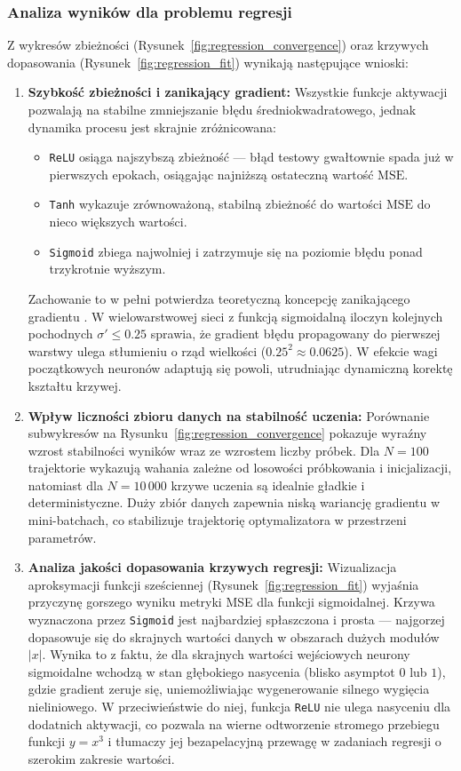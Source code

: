 \documentclass[11pt,a4paper]{article}
\begin{document}
\subsubsection{Analiza wyników dla problemu regresji}
Z wykresów zbieżności (Rysunek~\ref{fig:regression_convergence}) oraz krzywych dopasowania (Rysunek~\ref{fig:regression_fit}) wynikają następujące wnioski:
\begin{enumerate}
    \item \textbf{Szybkość zbieżności i zanikający gradient:}
    Wszystkie funkcje aktywacji pozwalają na stabilne zmniejszanie błędu średniokwadratowego, jednak dynamika procesu jest skrajnie zróżnicowana:
    \begin{itemize}
        \item \texttt{ReLU} osiąga najszybszą zbieżność — błąd testowy gwałtownie spada już w pierwszych epokach, osiągając najniższą ostateczną wartość $\text{MSE}$.
        \item \texttt{Tanh} wykazuje zrównoważoną, stabilną zbieżność do wartości $\text{MSE}$ do nieco większych wartości.
        \item \texttt{Sigmoid} zbiega najwolniej i zatrzymuje się na poziomie błędu ponad trzykrotnie wyższym.
    \end{itemize}
    Zachowanie to w pełni potwierdza teoretyczną koncepcję zanikającego gradientu . W wielowarstwowej sieci z funkcją sigmoidalną iloczyn kolejnych pochodnych $\sigma' \le 0.25$ sprawia, że gradient błędu propagowany do pierwszej warstwy ulega stłumieniu o rząd wielkości ($0.25^2 \approx 0.0625$). W efekcie wagi początkowych neuronów adaptują się powoli, utrudniając dynamiczną korektę kształtu krzywej.

    \item \textbf{Wpływ liczności zbioru danych na stabilność uczenia:}
    Porównanie subwykresów na Rysunku~\ref{fig:regression_convergence} pokazuje wyraźny wzrost stabilności wyników wraz ze wzrostem liczby próbek. Dla $N = 100$ trajektorie wykazują wahania zależne od losowości próbkowania i inicjalizacji, natomiast dla $N = 10\,000$ krzywe uczenia są idealnie gładkie i deterministyczne. Duży zbiór danych zapewnia niską wariancję gradientu w mini-batchach, co stabilizuje trajektorię optymalizatora w przestrzeni parametrów.

    \item \textbf{Analiza jakości dopasowania krzywych regresji:}
    Wizualizacja aproksymacji funkcji sześciennej (Rysunek~\ref{fig:regression_fit}) wyjaśnia przyczynę gorszego wyniku metryki MSE dla funkcji sigmoidalnej. Krzywa wyznaczona przez \texttt{Sigmoid} jest najbardziej spłaszczona i prosta — najgorzej dopasowuje się do skrajnych wartości danych w obszarach dużych modułów $|x|$. Wynika to z faktu, że dla skrajnych wartości wejściowych neurony sigmoidalne wchodzą w stan głębokiego nasycenia (blisko asymptot $0$ lub $1$), gdzie gradient zeruje się, uniemożliwiając wygenerowanie silnego wygięcia nieliniowego. 
    W przeciwieństwie do niej, funkcja \texttt{ReLU} nie ulega nasyceniu dla dodatnich aktywacji, co pozwala na wierne odtworzenie stromego przebiegu funkcji $y = x^3$ i tłumaczy jej bezapelacyjną przewagę w zadaniach regresji o szerokim zakresie wartości.
\end{enumerate}
\end{document}
